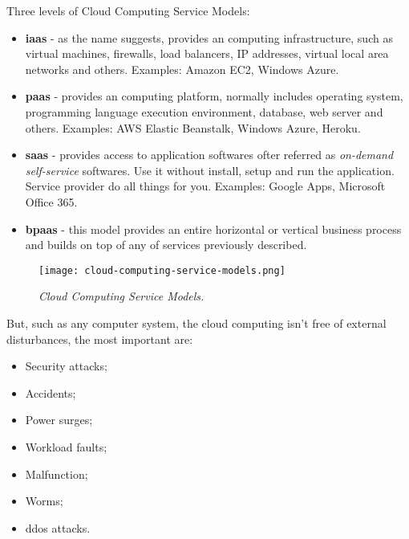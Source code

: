 Three levels of Cloud Computing Service Models:

\begin{itemize}
	\item \textbf{\ac{iaas}} - as the name suggests, provides an computing infrastructure, such as virtual machines, firewalls, load balancers, IP addresses, virtual local area networks and others. Examples: Amazon EC2, Windows Azure.

	\item \textbf{\ac{paas}} - provides an computing platform, normally includes operating system, programming language execution environment, database, web server and others. Examples: AWS Elastic Beanstalk, Windows Azure, Heroku.

	\item \textbf{\ac{saas}} - provides access to application softwares ofter referred as \textit{on-demand self-service} softwares. Use it without install, setup and run the application. Service provider do all things for you. Examples: Google Apps, Microsoft Office 365.

	\item \textbf{\ac{bpaas}} - this model provides an entire horizontal or vertical business process and builds on top of any of services previously described.

\end{itemize}

\begin{figure}[!ht]
\begin{center}
\texttt{[image: cloud-computing-service-models.png]}
\caption{\small \sl Cloud Computing Service Models.\label{fig:cloudcomputingservicemodels}}
\end{center}
\end{figure}

But, such as any computer system, the cloud computing isn't free of external disturbances\cite{wolter2012resilience}, the most important are:
\begin{itemize}
 	\item Security attacks;
 	\item Accidents;
 	\item Power surges;
 	\item Workload faults;
 	\item Malfunction;
 	\item Worms;
 	\item \ac{ddos} attacks.
 \end{itemize}

